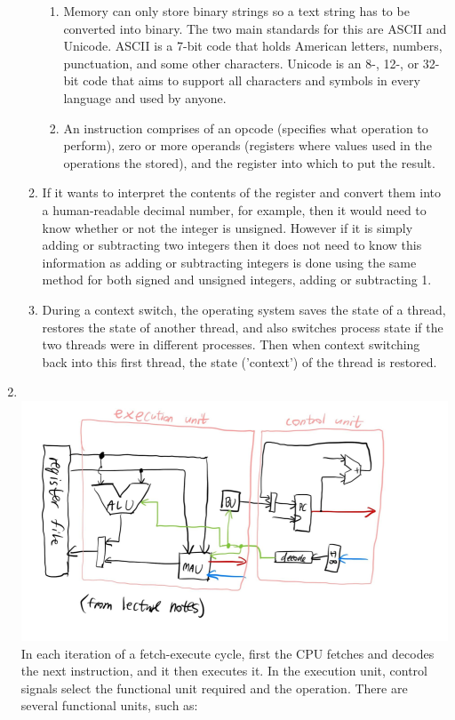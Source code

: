 \documentclass[12pt]{article}
\begin{document}
\begin{enumerate}
\begin{enumerate}
\begin{enumerate}
                              \item Memory can only store binary strings so a text string has to be converted into binary. The two main standards for this are ASCII and Unicode. ASCII is a 7-bit code that holds American letters, numbers, punctuation, and some other characters. Unicode is an 8-, 12-, or 32-bit code that aims to support all characters and symbols in every language and used by anyone.
                              \item An instruction comprises of an opcode (specifies what operation to perform), zero or more operands (registers where values used in the operations the stored), and the register into which to put the result.
                        \end{enumerate}
                  \item If it wants to interpret the contents of the register and convert them into a human-readable decimal number, for example, then it would need to know whether or not the integer is unsigned. However if it is simply adding or subtracting two integers then it does not need to know this information as adding or subtracting integers is done using the same method for both signed and unsigned integers, adding or subtracting 1.
                  \item During a context switch, the operating system saves the state of a thread, restores the state of another thread, and also switches process state if the two threads were in different processes. Then when context switching back into this first thread, the state ('context') of the thread is restored.
            \end{enumerate}
      \item \(\)\\\includegraphics[scale=0.5]{1-q3.png} In each iteration of a fetch-execute cycle, first the CPU fetches and decodes the next instruction, and it then executes it. In the execution unit, control signals select the functional unit required and the operation. There are several functional units, such as: \begin{itemize}

\end{itemize}
\end{enumerate}
\end{document}
